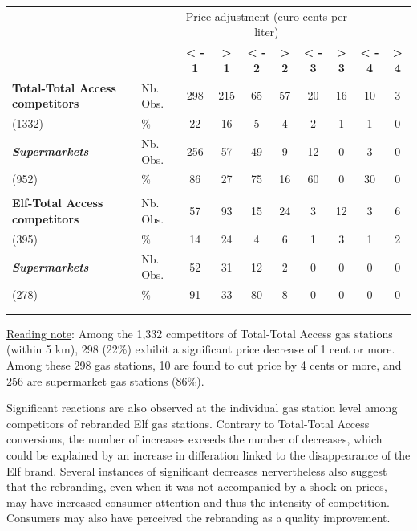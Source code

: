 \documentclass[english]{article}
\begin{document}
\begin{center}
\begin{tiny} %
\begin{tabular}{llcccccccc}
 &  &  &  &  &  &  &  &  & \tabularnewline
\hline
\hline
{} & {} & \multicolumn{6}{c}{Price adjustment (euro cents per liter)} \tabularnewline
 &  & \textbf{< - 1}  & \textbf{> 1}  & \textbf{< - 2}  & \textbf{> 2}  & \textbf{< - 3}  & \textbf{> 3}  & \textbf{< - 4}  & \textbf{> 4}\tabularnewline
\hline
\textbf{Total-Total Access competitors}  & Nb. Obs.  & 298  & 215  & 65  & 57  & 20  & 16  & 10  & 3\tabularnewline
(1332)  & \%  & 22  & 16  & 5  & 4  & 2  & 1  & 1  & 0\tabularnewline
\textbf{\textit{Supermarkets}}  & Nb. Obs.  & 256  & 57  & 49  & 9  & 12  & 0  & 3  & 0\tabularnewline
(952)  & \%  & 86  & 27  & 75  & 16  & 60  & 0  & 30  & 0\tabularnewline
 &  &  &  &  &  &  &  &  & \tabularnewline
\hline
\textbf{Elf-Total Access competitors}  & Nb. Obs.  & 57  & 93  & 15  & 24  & 3  & 12  & 3  & 6\tabularnewline
(395)  & \%  & 14  & 24  & 4  & 6  & 1  & 3  & 1  & 2\tabularnewline
\textbf{\textit{Supermarkets}}  & Nb. Obs.  & 52  & 31  & 12  & 2  & 0  & 0  & 0  & 0\tabularnewline
(278)  & \%  & 91  & 33  & 80  & 8  & 0  & 0  & 0  & 0\tabularnewline
 &  &  &  &  &  &  &  &  & \tabularnewline
\hline
\hline
 &  &  &  &  &  &  &  &  & \tabularnewline
\end{tabular}\end{tiny}
\par\end{center}

{\small{}\uline{Reading note}}{\small{}:} Among the 1,332 competitors of Total-Total Access gas stations (within 5 km), 298 (22\%) exhibit a significant price decrease of 1 cent or more. Among these 298 gas stations, 10 are found to cut price by 4 cents or more, and 256 are supermarket gas stations (86\%).
\medskip{}

Significant reactions are also observed at the individual gas station level among competitors of rebranded Elf gas stations. Contrary to Total-Total Access conversions, the number of increases exceeds the number of decreases, which could be explained by an increase in differation linked to the disappearance of the Elf brand. Several instances of significant decreases nervertheless also suggest that the rebranding, even when it was not accompanied by a shock on prices, may have increased consumer attention and thus the intensity of competition. Consumers may also have perceived the rebranding as a quality improvement.
\medskip{}
\end{document}
